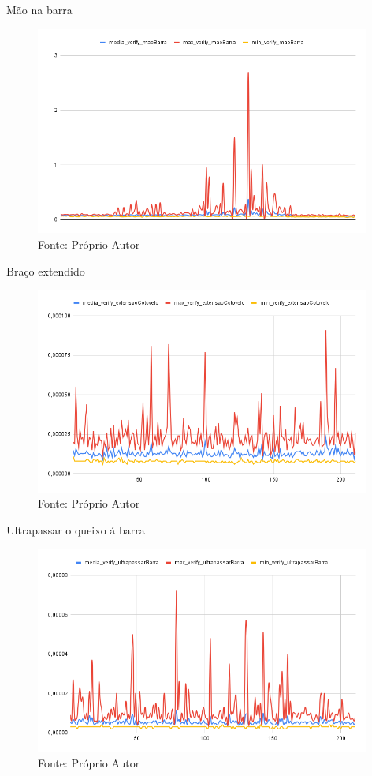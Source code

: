 \begin{frame}{Mão na barra}
   \begin{figure}[H]
    \includegraphics[width=11cm]{img/resultados/maoBarra.png}
    {Fonte: Próprio Autor}
    \label{figura:configs_server}
    \end{figure}
\end{frame}

\begin{frame}{Braço extendido}
   \begin{figure}[H]
    \includegraphics[width=11cm]{img/resultados/extensaoCotovelo.png}
    {Fonte: Próprio Autor}
    \label{figura:configs_server}
    \end{figure}
\end{frame}

\begin{frame}{Ultrapassar o queixo á barra}
   \begin{figure}[H]
    \includegraphics[width=11cm]{img/resultados/ultrapassarBarra.png}
    {Fonte: Próprio Autor}
    \label{figura:configs_server}
    \end{figure}
\end{frame}

